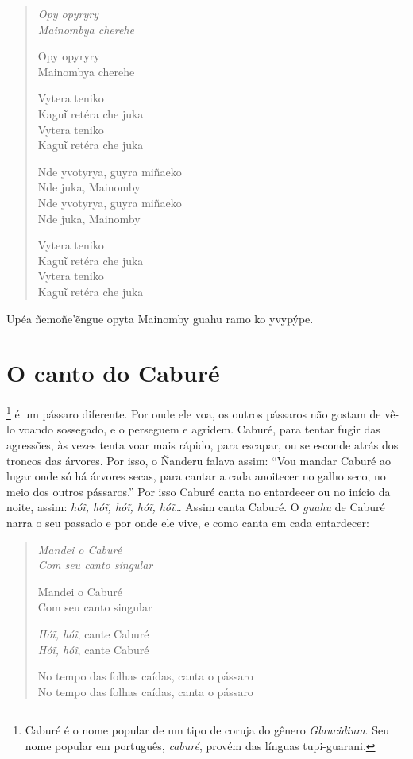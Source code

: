 \begin{verse}
\itshape
Opy opyryry\\
Mainombya cherehe

Opy opyryry\\
Mainombya cherehe

Vytera teniko\\
Kaguῖ retéra che juka\\
Vytera teniko\\
Kaguῖ retéra che juka

Nde yvotyrya, guyra miñaeko\\
Nde juka, Mainomby\\
Nde yvotyrya, guyra miñaeko\\
Nde juka, Mainomby

\pagebreak
Vytera teniko\\
Kaguῖ retéra che juka\\
Vytera teniko\\
Kaguῖ retéra che juka
\end{verse}

Upéa ñemoñe'ẽngue opyta Mainomby guahu ramo ko yvypýpe.

\chapter{O canto do Caburé}

\footnote{Caburé é o nome popular de um tipo de coruja do gênero
  \emph{Glaucidium}. Seu nome popular em português, \emph{caburé},
  provém das línguas tupi-guarani.} é um pássaro diferente. Por onde ele
  voa, os outros pássaros não gostam de vê-lo voando sossegado, e o
  perseguem e agridem. Caburé, para tentar fugir das agressões, às vezes
  tenta voar mais rápido, para escapar, ou se esconde atrás dos troncos
  das árvores. Por isso, o Ñanderu falava assim: ``Vou mandar Caburé ao
  lugar onde só há árvores secas, para cantar a cada anoitecer no galho
  seco, no meio dos outros pássaros.'' Por isso Caburé canta no entardecer
  ou no início da noite, assim: \emph{hóĩ, hóĩ, hóĩ, hóĩ, hóĩ}\ldots{} Assim canta
  Caburé. O \emph{guahu} de Caburé narra o seu passado e por onde ele
  vive, e como canta em cada entardecer:

\begin{verse}
\itshape
Mandei o Caburé\\
Com seu canto singular

Mandei o Caburé\\
Com seu canto singular

\emph{Hóĩ, hóĩ}, cante Caburé\\
\emph{Hóĩ, hóĩ}, cante Caburé

No tempo das folhas caídas, canta o pássaro\\
No tempo das folhas caídas, canta o pássaro
\end{verse}

